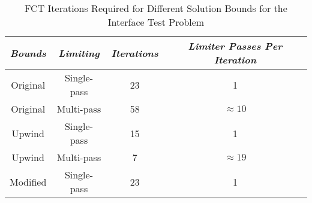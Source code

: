 \begin{table}[htb]\caption{FCT Iterations Required for Different Solution Bounds
  for the Interface Test Problem}
\label{tab:interface_iterations}
\centering
\begin{tabular}{c c c c}\toprule
\emph{Bounds} & \emph{Limiting} & \emph{Iterations}
  & \emph{Limiter Passes Per Iteration}\\\midrule
Original & Single-pass & 23 & 1\\
Original & Multi-pass  & 58 & $\approx 10$\\
Upwind   & Single-pass & 15 & 1\\
Upwind   & Multi-pass  & 7  & $\approx 19$\\
Modified & Single-pass & 23 & 1\\
\bottomrule\end{tabular}
\end{table}

\clearpage
